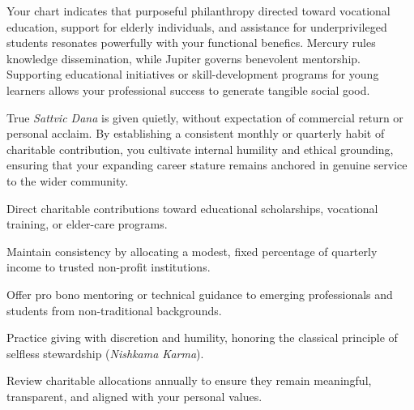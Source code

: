 {\fontsize{9}{13}\selectfont Your chart indicates that purposeful philanthropy directed toward vocational education, support for elderly individuals, and assistance for underprivileged students resonates powerfully with your functional benefics. Mercury rules knowledge dissemination, while Jupiter governs benevolent mentorship. Supporting educational initiatives or skill-development programs for young learners allows your professional success to generate tangible social good.}\par\vspace{1.8mm}

{\fontsize{9}{13}\selectfont True \textit{Sattvic Dana} is given quietly, without expectation of commercial return or personal acclaim. By establishing a consistent monthly or quarterly habit of charitable contribution, you cultivate internal humility and ethical grounding, ensuring that your expanding career stature remains anchored in genuine service to the wider community.}\par\vspace{1.8mm}

\begin{diamondlist}
  \item {\fontsize{8.5}{12}\selectfont Direct charitable contributions toward educational scholarships, vocational training, or elder-care programs.}
  \item {\fontsize{8.5}{12}\selectfont Maintain consistency by allocating a modest, fixed percentage of quarterly income to trusted non-profit institutions.}
  \item {\fontsize{8.5}{12}\selectfont Offer pro bono mentoring or technical guidance to emerging professionals and students from non-traditional backgrounds.}
  \item {\fontsize{8.5}{12}\selectfont Practice giving with discretion and humility, honoring the classical principle of selfless stewardship (\textit{Nishkama Karma}).}
  \item {\fontsize{8.5}{12}\selectfont Review charitable allocations annually to ensure they remain meaningful, transparent, and aligned with your personal values.}
\end{diamondlist}

